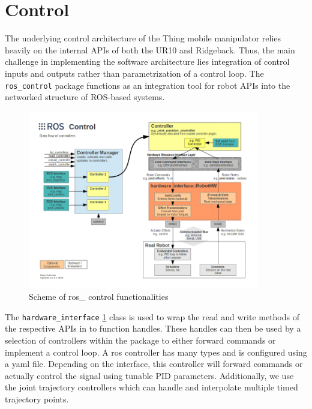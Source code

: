 \documentclass[times, utf8, diplomski, english]{fer}
\begin{document}
\section{Control}\label{section:control}
The underlying control architecture of the Thing mobile manipulator relies heavily on the internal APIs of both the UR10 and Ridgeback.
Thus, the main challenge in implementing the software architecture lies integration of control inputs and outputs rather than parametrization of a control loop.
The \verb|ros_control| package functions as an integration tool for robot APIs into the networked structure of ROS-based systems.
\begin{figure}\label{fig:ros control}
\centering
\includegraphics[width=0.9\textwidth]{ros_control}
\caption{Scheme of ros\_ control functionalities}
\end{figure}
The \verb|hardware_interface| \ref{fig:ros control} class is used to wrap the read and write methods of the respective APIs in to function handles. 
These handles can then be used by a selection of controllers within the package to either forward commands or implement a control loop.
A ros controller has many types and is configured using a yaml file. 
Depending on the interface, this controller will forward commands or actually control the signal using tunable PID parameters.
Additionally, we use the joint trajectory controllers which can handle and interpolate multiple timed trajectory points.
\end{document}
